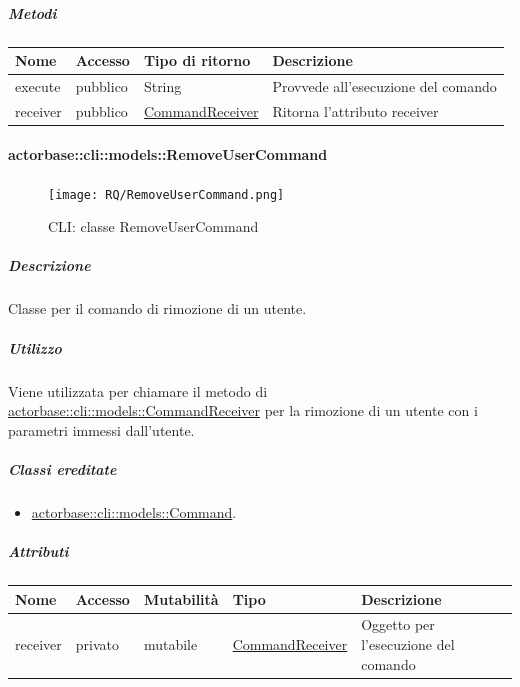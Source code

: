 \documentclass{scalatekids-article}
\begin{document}
\subparagraph{Metodi}

\begin{tabular}{| l | l | l | l |}
  \hline
  Nome & Accesso & Tipo di ritorno & Descrizione\\
  \hline
  execute & pubblico & String & Provvede all'esecuzione del comando\\
  \hline
  receiver & pubblico & \hyperref[sec:actorbase::cli::models::CommandReceiver]{CommandReceiver} & Ritorna l'attributo receiver\\
  \hline
\end{tabular}

\paragraph{actorbase::cli::models::RemoveUserCommand}
\label{sec:actorbase::cli::models::RemoveUserCommand}

\begin{figure}[H]
  \begin{center}
    \texttt{[image: RQ/RemoveUserCommand.png]}
    \caption{CLI: classe RemoveUserCommand}
  \end{center}
\end{figure}

\subparagraph{Descrizione}

Classe per il comando di rimozione di un utente.

\subparagraph{Utilizzo}

Viene utilizzata per chiamare il metodo di
\hyperref[sec:actorbase::cli::models::CommandReceiver]{actorbase::cli::models::CommandReceiver} per la rimozione di un utente con i
parametri immessi dall'utente.

\subparagraph{Classi ereditate}

\begin{itemize}
\item \hyperref[sec:actorbase::cli::models::Command]{actorbase::cli::models::Command}.
\end{itemize}

\subparagraph{Attributi}

\begin{tabular}{| p{1cm} | p{1.5cm} | p{2cm} | p{4cm} | p{8.5cm} |}
  Nome & Accesso & Mutabilità & Tipo & Descrizione\\
  \hline
  receiver & privato & mutabile & \hyperref[sec:actorbase::cli::models::CommandReceiver]{CommandReceiver} & Oggetto per l'esecuzione del comando\\
  \hline
\end{tabular}
\end{document}
